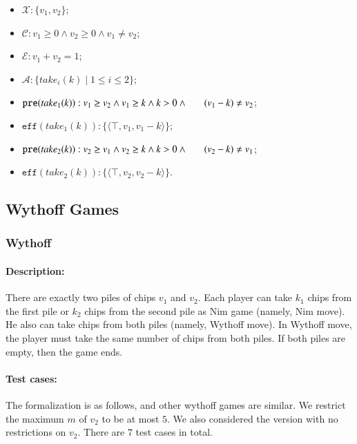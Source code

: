 \documentclass[review]{elsarticle}
\newcommand{\set}[1]{\{ #1 \}}
\newcommand{\tuple}[1]{\langle {#1} \rangle}
\newcommand{\true}{\top}
\newcommand{\statevar}{\mathcal{X}}
\newcommand{\act}{\mathcal{A}}
\newcommand{\constraint}{\mathcal{C}}
\newcommand{\estate}{\mathcal{E}}
\newcommand{\pre}{\mathtt{pre}}
\newcommand{\eff}{\mathtt{eff}}
\begin{document}
\begin{itemize}
	\item $\statevar: \set{v_1, v_2}$;
	\item $\constraint: v_1 \ge 0 \wedge v_2 \ge 0 \wedge v_1 \neq v_2$;
	\item $\estate:  v_1 + v_2  =1 $;
	\item $\act:\set{take_i(k){\mid}1\le i \le2}$;
	\item $\pre(take_1(k)) : v_1 \ge v_2 \wedge v_1 \ge k \wedge k > 0 \wedge \\ \hspace*{6mm}
	(v_1-k) \neq v_2$;
	\item $\eff(take_1(k)) : \set{\tuple{\true,  v_1,  v_1 - k}}$;
	\item $\pre(take_2(k)) :  v_2 \ge v_1 \wedge v_2 \ge k \wedge k > 0 \wedge \\ \hspace*{6mm}
	(v_2-k) \neq v_1 $;
	\item $\eff(take_2(k)) : \set{\tuple{\true,  v_2,  v_2 - k}}$.
\end{itemize}

\subsection{Wythoff Games}



\subsubsection{Wythoff \protect\cite{Wyt1907}}

\paragraph{Description:}  
There are exactly two piles of chips $v_1$ and $v_2$.
Each player can take $k_1$ chips from the first pile or $k_2$ chips from the second pile as Nim game (namely, Nim move).
He also can take chips from both piles (namely, Wythoff move).
In Wythoff move, the player must take the same number of chips from both piles.
If both piles are empty, then the game ends.	

\paragraph{Test cases:}
The formalization is as follows, and other wythoff games are similar.
We restrict the maximum $m$ of $v_2$ to be at most $5$.
We also considered the version with no restrictions on $v_2$.
There are $7$ test cases in total.
\end{document}
